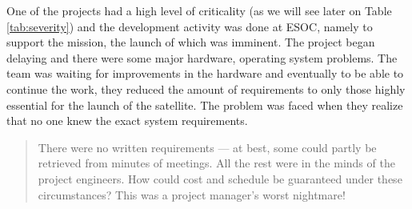 One of the projects had a high level of criticality (as we will see later on Table \ref{tab:severity}) and the
development activity was done at \ac{ESOC}, namely to support the mission, the launch of which was imminent.
The project began delaying and there were some major hardware, operating system problems. The team was waiting for improvements in the hardware
and eventually to be able to continue the work, they reduced the amount of requirements to only
those highly essential for the launch of the satellite. The problem was faced when they realize that no one knew the exact system requirements.
\begin{quotation}
There were no written requirements — at best, some could partly be
retrieved from minutes of meetings. All the rest were in the minds of the project engineers. How
could cost and schedule be guaranteed under these circumstances? This was a project manager's
worst nightmare!\cite{esa-bulletin-90}
\end{quotation}

